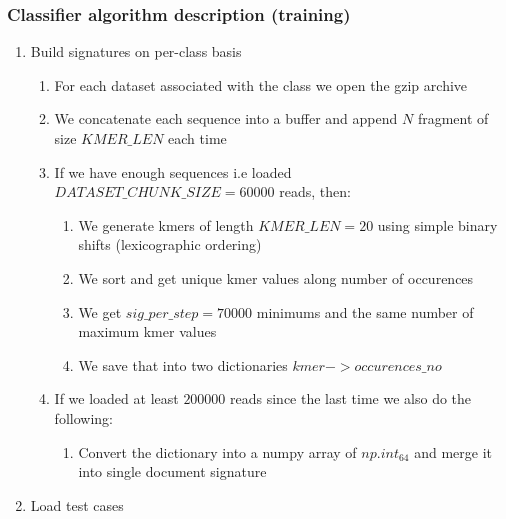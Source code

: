 \begin{frame}[fragile]
  \frametitle{Classifier algorithm description (training)}
  \begin{enumerate}
    \scriptsize
    \item Build signatures on per-class basis
    \begin{enumerate}
      \scriptsize
      \item For each dataset associated with the class we open the gzip archive
      \item We concatenate each sequence into a buffer and append $N$ fragment of size $KMER\_LEN$ each time
      \item If we have enough sequences i.e loaded $DATASET\_CHUNK\_SIZE = 60000$ reads, then:
      \begin{enumerate}
        \scriptsize
        \item We generate kmers of length $KMER\_LEN = 20$ using simple binary shifts (lexicographic ordering)
        \item We sort and get unique kmer values along number of occurences
        \item We get $sig\_per\_step = 70000$ minimums and the same number of maximum kmer values
        \item We save that into two dictionaries $kmer -> occurences\_no$
      \end{enumerate}
      \item If we loaded at least $200000$ reads since the last time we also do the following:
      \begin{enumerate}
        \scriptsize
        \item Convert the dictionary into a numpy array of $np.int_{64}$ and merge it into single document signature
      \end{enumerate}
    \end{enumerate}
    \item Load test cases
  \end{enumerate}
\end{frame}

